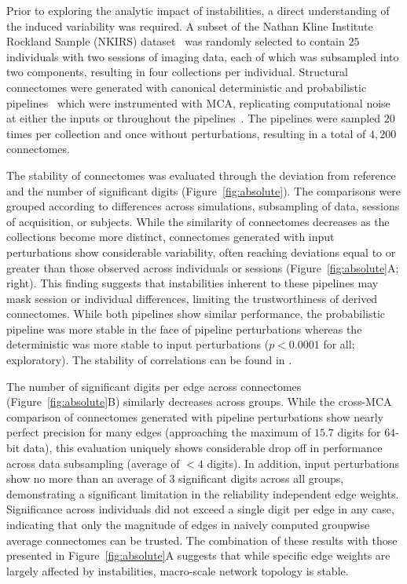 \documentclass[fleqn,10pt]{SelfArx} %
\begin{document}
Prior to exploring the analytic impact of instabilities, a direct understanding of the induced variability was
required. A subset of the Nathan Kline Institute Rockland Sample (NKIRS) dataset~\cite{Nooner2012-eg} was randomly
selected to contain $25$ individuals with two sessions of imaging data, each of which was subsampled into two
components, resulting in four collections per individual. Structural connectomes were generated with canonical
deterministic and probabilistic pipelines~\cite{Garyfallidis2014-ql,Garyfallidis2012-gg} which were instrumented with
MCA, replicating computational noise at either the inputs or throughout the pipelines~\cite{Denis2016-wo,Kiar2020-lb}.
The pipelines were sampled $20$ times per collection and once without perturbations, resulting in a total of $4,200$
connectomes.

The stability of connectomes was evaluated through the deviation from reference and the number of significant digits
(Figure~\ref{fig:absolute}). The comparisons were grouped according to differences across simulations, subsampling
of data, sessions of acquisition, or subjects. While the similarity of connectomes decreases as the collections become
more distinct, connectomes generated with input perturbations show considerable variability, often reaching deviations
equal to or greater than those observed across individuals or sessions (Figure~\ref{fig:absolute}A; right). This
finding suggests that instabilities inherent to these pipelines may mask session or individual differences, limiting
the trustworthiness of derived connectomes. While both pipelines show similar performance, the probabilistic pipeline
was more stable in the face of pipeline perturbations whereas the deterministic was more stable to input perturbations
($p < 0.0001$ for all; exploratory). The stability of correlations can be found in .

The number of significant digits per edge across connectomes (Figure~\ref{fig:absolute}B) similarly decreases across
groups. While the cross-MCA comparison of connectomes generated with pipeline perturbations show nearly perfect
precision for many edges (approaching the maximum of $15.7$ digits for $64$-bit data), this evaluation uniquely shows
considerable drop off in performance across data subsampling (average of $< 4$ digits). In addition, input
perturbations show no more than an average of $3$ significant digits across all groups, demonstrating a significant
limitation in the reliability independent edge weights. Significance across individuals did not exceed a single digit
per edge in any case, indicating that only the magnitude of edges in naively computed groupwise average connectomes can
be trusted. The combination of these results with those presented in Figure~\ref{fig:absolute}A suggests that while
specific edge weights are largely affected by instabilities, macro-scale network topology is stable.
\end{document}
